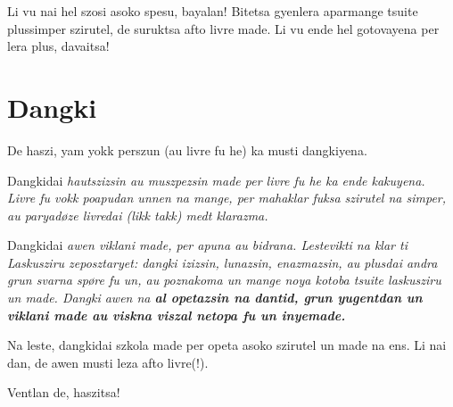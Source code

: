Li vu nai hel szosi asoko spesu, bayalan! Bitetsa gyenlera aparmange tsuite
plussimper szirutel, de suruktsa afto livre made. Li vu ende hel gotovayena
per lera plus, davaitsa!


\section*{Dangki}
De haszi, yam yokk perszun (au livre fu he) ka musti dangkiyena.

Dangkidai \it{hautszizsin} au \it{muszpezsin} made per livre fu he
ka ende kakuyena. Livre fu vokk poapudan unnen na mange, per mahaklar
fuksa szirutel na simper, au paryadøze livredai (likk takk) medt klarazma.

Dangkidai \it{awen} viklani made, per apuna au bidrana. Lestevikti na
klar ti \it{Laskusziru} zeposztaryet: dangki \it{izizsin}, \it{lunazsin},
\it{enazmazsin}, au plusdai andra grun svarna spøre fu un, au poznakoma un
mange noya kotoba tsuite laskusziru un made. Dangki awen na \bf{al} opetazsin na
dantid, grun yugentdan un viklani made au viskna viszal netopa fu un inyemade.

Na leste, dangkidai szkola made per opeta asoko szirutel un made na ens. Li nai dan,
de awen musti leza afto livre(!).

\begin{center}
  Ventlan de, haszitsa!
\end{center}
